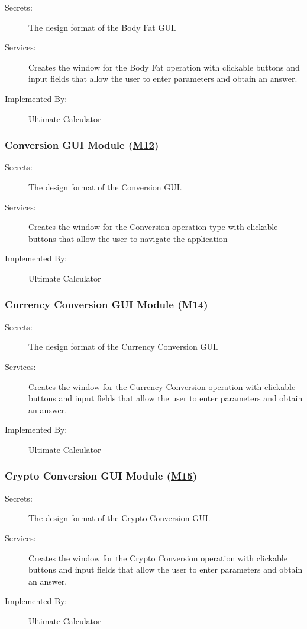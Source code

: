 \documentclass[12pt, titlepage]{article}
\begin{document}
\begin{description}
\item[Secrets:]The design format of the Body Fat GUI.
\item[Services:] Creates the window for the Body Fat operation with clickable buttons and input fields that allow the user to enter parameters and obtain an answer.
\item[Implemented By:] Ultimate Calculator
\end{description}

\subsubsection{Conversion GUI Module (\hyperref[m12]{M12})}

\begin{description}
\item[Secrets:]The design format of the Conversion GUI.
\item[Services:] Creates the window for the Conversion operation type with clickable buttons that allow the user to navigate the application
\item[Implemented By:] Ultimate Calculator
\end{description}

\subsubsection{Currency Conversion GUI Module (\hyperref[m14]{M14})}

\begin{description}
\item[Secrets:]The design format of the Currency Conversion GUI.
\item[Services:] Creates the window for the Currency Conversion operation with clickable buttons and input fields that allow the user to enter parameters and obtain an answer.
\item[Implemented By:] Ultimate Calculator
\end{description}

\subsubsection{Crypto Conversion GUI Module (\hyperref[m15]{M15})}

\begin{description}
\item[Secrets:]The design format of the Crypto Conversion GUI.
\item[Services:] Creates the window for the Crypto Conversion operation with clickable buttons and input fields that allow the user to enter parameters and obtain an answer.
\item[Implemented By:] Ultimate Calculator
\end{description}
\end{document}
